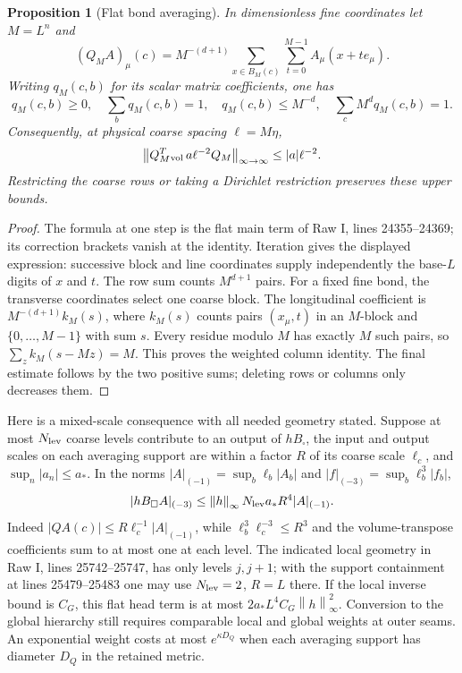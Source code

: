 \documentclass[11pt]{article}
\newtheorem{proposition}[theorem]{Proposition}
\theoremstyle{remark}
\newcommand{\norm}[1]{\left\|#1\right\|}
\begin{document}
\begin{proposition}[Flat bond averaging]\label{prop:flat-average}
In dimensionless fine coordinates let $M=L^n$ and
\[
 (Q_M A)_\mu(c)=M^{-(d+1)}
       \sum_{x\in B_M(c)}\sum_{t=0}^{M-1}A_\mu(x+t e_\mu).
\]
Writing $q_M(c,b)$ for its scalar matrix coefficients, one has
\[
 q_M(c,b)\ge0,\quad \sum_bq_M(c,b)=1,\quad
 q_M(c,b)\le M^{-d},\quad \sum_cM^dq_M(c,b)=1.
\]
Consequently, at physical coarse spacing $\ell=M\eta$,
\[
 \norm{Q_M^T{}_{\rm vol}\,a\ell^{-2}Q_M}_{\infty\to\infty}
 \le |a|\ell^{-2}.
\]
Restricting the coarse rows or taking a Dirichlet restriction preserves
these upper bounds.
\end{proposition}

\begin{proof}
The formula at one step is the flat main term of Raw I,
lines 24355--24369; its correction brackets vanish at the identity.
Iteration gives the displayed expression: successive block and line
coordinates supply independently the base-$L$ digits of $x$ and $t$.
The row sum counts $M^{d+1}$ pairs. For a fixed fine bond, the
transverse coordinates select one coarse block. The longitudinal
coefficient is $M^{-(d+1)}k_M(s)$, where $k_M(s)$ counts pairs
$(x_\mu,t)$ in an $M$-block and $\{0,\ldots,M-1\}$ with sum $s$.
Every residue modulo $M$ has exactly $M$ such pairs, so
$\sum_zk_M(s-Mz)=M$. This proves the weighted column identity.
The final estimate follows by the two positive sums; deleting rows
or columns only decreases them.
\end{proof}

Here is a mixed-scale consequence with all needed geometry stated.
Suppose at most $N_{\rm lev}$ coarse levels contribute to an output
of $hB_\square$, the input and output scales on each averaging support
are within a factor $R$ of its coarse scale $\ell_c$, and
$\sup_n|a_n|\le a_*$. In the norms
$|A|_{(-1)}=\sup_b\ell_b|A_b|$ and
$|f|_{(-3)}=\sup_b\ell_b^3|f_b|$,
\begin{equation}\label{eq:flat-mixed-average}
 |hB_\square A|_{(-3)}
 \le\norm h_\infty N_{\rm lev}a_*R^4|A|_{(-1)}.
\end{equation}
Indeed $|QA(c)|\le R\ell_c^{-1}|A|_{(-1)}$, while
$\ell_b^3\ell_c^{-3}\le R^3$ and the volume-transpose
coefficients sum to at most one at each level. The indicated local
geometry in Raw I, lines 25742--25747, has only levels $j,j+1$;
with the support containment at lines 25479--25483 one may use
$N_{\rm lev}=2$, $R=L$ there. If the local inverse bound is $C_G$,
this flat head term is at most
$2a_*L^4 C_G\norm h_\infty^2$. Conversion to the global hierarchy
still requires comparable local and global weights at outer seams.
An exponential weight costs at most $e^{\kappa D_Q}$ when each
averaging support has diameter $D_Q$ in the retained metric.
\end{document}
